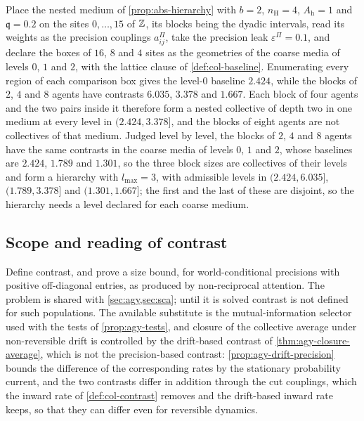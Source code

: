 \begin{observation}\label{obs:col-nested-medium}
Place the nested medium of \cref{prop:abs-hierarchy} with $b=2$, $n_{\mathrm H}=4$, $A_{\mathrm h}=1$ and $\mathfrak q=0.2$ on the sites $0,\dots,15$ of $\mathbb{Z}$, its blocks being the dyadic intervals, read its weights as the precision couplings $a^\Pi_{ij}$, take the precision leak $\varepsilon^\Pi=0.1$, and declare the boxes of $16$, $8$ and $4$ sites as the geometries of the coarse media of levels $0$, $1$ and $2$, with the lattice clause of \cref{def:col-baseline}. Enumerating every region of each comparison box gives the level-$0$ baseline $2.424$, while the blocks of $2$, $4$ and $8$ agents have contrasts $6.035$, $3.378$ and $1.667$. Each block of four agents and the two pairs inside it therefore form a nested collective of depth two in one medium at every level in $(2.424,3.378]$, and the blocks of eight agents are not collectives of that medium. Judged level by level, the blocks of $2$, $4$ and $8$ agents have the same contrasts in the coarse media of levels $0$, $1$ and $2$, whose baselines are $2.424$, $1.789$ and $1.301$, so the three block sizes are collectives of their levels and form a hierarchy with $l_{\max}=3$, with admissible levels in $(2.424,6.035]$, $(1.789,3.378]$ and $(1.301,1.667]$; the first and the last of these are disjoint, so the hierarchy needs a level declared for each coarse medium.
\end{observation}

\subsection{Scope and reading of contrast}\label{sup:col-scope-and-reading-of-contrast}

\begin{openproblem}\label{open:col-non-diffusive}
Define contrast, and prove a size bound, for world-conditional precisions with positive off-diagonal entries, as produced by non-reciprocal attention. The problem is shared with \cref{sec:agy,sec:sca}; until it is solved contrast is not defined for such populations. The available substitute is the mutual-information selector used with the tests of \cref{prop:agy-tests}, and closure of the collective average under non-reversible drift is controlled by the drift-based contrast of \cref{thm:agy-closure-average}, which is not the precision-based contrast: \cref{prop:agy-drift-precision} bounds the difference of the corresponding rates by the stationary probability current, and the two contrasts differ in addition through the cut couplings, which the inward rate of \cref{def:col-contrast} removes and the drift-based inward rate keeps, so that they can differ even for reversible dynamics.
\end{openproblem}

